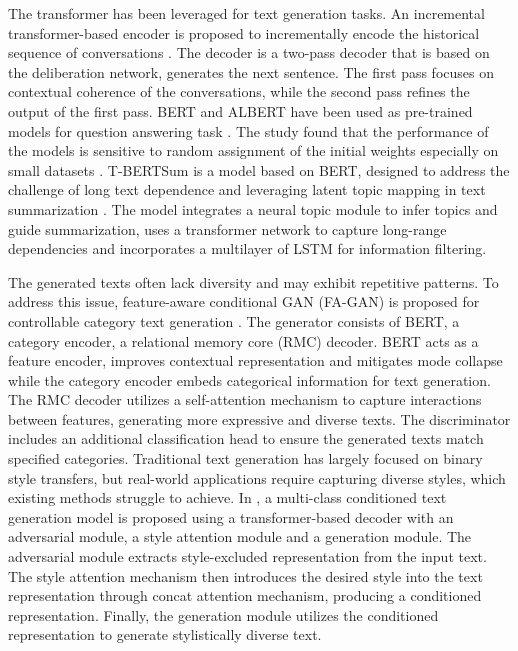 \documentclass[preprint,12pt]{elsarticle}
\begin{document}
The transformer has been leveraged for text generation tasks. An incremental transformer-based encoder is proposed to incrementally encode the historical sequence of conversations \citep{li_incremental_2019}. The decoder is a two-pass decoder that is based on the deliberation network, generates the next sentence. The first pass focuses on contextual coherence of the conversations, while the second pass refines the output of the first pass. BERT and ALBERT have been used as pre-trained models for question answering task \citep{alrowili_biom-transformers_2021}. The study found that the performance of the models is sensitive to random assignment of the initial weights especially on small datasets \citep{alrowili_exploring_2022}. T-BERTSum is a model based on BERT, designed to address the challenge of long text dependence and leveraging latent topic mapping in text summarization \citep{ma_t-bertsum_2021}. The model integrates a neural topic module to infer topics and guide summarization, uses a transformer network to capture long-range dependencies and incorporates a multilayer of LSTM for information filtering. 

The generated texts often lack diversity and may exhibit repetitive patterns. To address this issue, feature-aware conditional GAN (FA-GAN) is proposed for controllable category text generation \citep{li_feature-aware_2023}. The generator consists of BERT, a category encoder, a relational memory core (RMC) decoder. BERT acts as a feature encoder, improves contextual representation and mitigates mode collapse while the category encoder embeds categorical information for text generation. The RMC decoder utilizes a self-attention mechanism to capture interactions between features, generating more expressive and diverse texts. The discriminator includes an additional classification head to ensure the generated texts match specified categories. Traditional text generation has largely focused on binary style transfers, but real-world applications require capturing diverse styles, which existing methods struggle to achieve. In \citep{kwon_class_2024}, a multi-class conditioned text generation model is proposed using a transformer-based decoder with an adversarial module, a style attention module and a generation module. The adversarial module extracts style-excluded representation from the input text. The style attention mechanism then introduces the desired style into the text representation through concat attention mechanism, producing a conditioned representation. Finally, the generation module utilizes the conditioned representation to generate stylistically diverse text.
\end{document}
